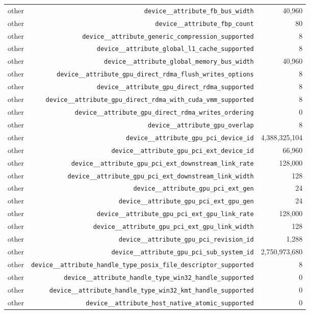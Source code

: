\begin{table}[h]
\begin{tabular}{|l|r|r|}
other & \texttt{device__attribute_fb_bus_width} & 40,960 \\
other & \texttt{device__attribute_fbp_count} & 80 \\
other & \texttt{device__attribute_generic_compression_supported} & 8 \\
other & \texttt{device__attribute_global_l1_cache_supported} & 8 \\
other & \texttt{device__attribute_global_memory_bus_width} & 40,960 \\
other & \texttt{device__attribute_gpu_direct_rdma_flush_writes_options} & 8 \\
other & \texttt{device__attribute_gpu_direct_rdma_supported} & 8 \\
other & \texttt{device__attribute_gpu_direct_rdma_with_cuda_vmm_supported} & 8 \\
other & \texttt{device__attribute_gpu_direct_rdma_writes_ordering} & 0 \\
other & \texttt{device__attribute_gpu_overlap} & 8 \\
other & \texttt{device__attribute_gpu_pci_device_id} & 4,388,325,104 \\
other & \texttt{device__attribute_gpu_pci_ext_device_id} & 66,960 \\
other & \texttt{device__attribute_gpu_pci_ext_downstream_link_rate} & 128,000 \\
other & \texttt{device__attribute_gpu_pci_ext_downstream_link_width} & 128 \\
other & \texttt{device__attribute_gpu_pci_ext_gen} & 24 \\
other & \texttt{device__attribute_gpu_pci_ext_gpu_gen} & 24 \\
other & \texttt{device__attribute_gpu_pci_ext_gpu_link_rate} & 128,000 \\
other & \texttt{device__attribute_gpu_pci_ext_gpu_link_width} & 128 \\
other & \texttt{device__attribute_gpu_pci_revision_id} & 1,288 \\
other & \texttt{device__attribute_gpu_pci_sub_system_id} & 2,750,973,680 \\
other & \texttt{device__attribute_handle_type_posix_file_descriptor_supported} & 8 \\
other & \texttt{device__attribute_handle_type_win32_handle_supported} & 0 \\
other & \texttt{device__attribute_handle_type_win32_kmt_handle_supported} & 0 \\
other & \texttt{device__attribute_host_native_atomic_supported} & 0 \\

\end{tabular}
\end{table}
